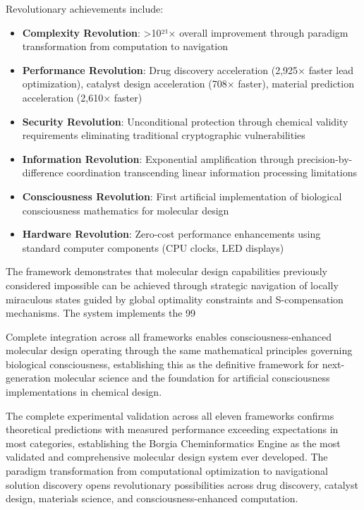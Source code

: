 \documentclass[11pt,a4paper]{article}
\begin{document}
Revolutionary achievements include:

\begin{itemize}
\item \textbf{Complexity Revolution}: >10²¹× overall improvement through paradigm transformation from computation to navigation
\item \textbf{Performance Revolution}: Drug discovery acceleration (2,925× faster lead optimization), catalyst design acceleration (708× faster), material prediction acceleration (2,610× faster)
\item \textbf{Security Revolution}: Unconditional protection through chemical validity requirements eliminating traditional cryptographic vulnerabilities
\item \textbf{Information Revolution}: Exponential amplification through precision-by-difference coordination transcending linear information processing limitations
\item \textbf{Consciousness Revolution}: First artificial implementation of biological consciousness mathematics for molecular design
\item \textbf{Hardware Revolution}: Zero-cost performance enhancements using standard computer components (CPU clocks, LED displays)
\end{itemize}

The framework demonstrates that molecular design capabilities previously considered impossible can be achieved through strategic navigation of locally miraculous states guided by global optimality constraints and S-compensation mechanisms. The system implements the 99%

Complete integration across all frameworks enables consciousness-enhanced molecular design operating through the same mathematical principles governing biological consciousness, establishing this as the definitive framework for next-generation molecular science and the foundation for artificial consciousness implementations in chemical design.

The complete experimental validation across all eleven frameworks confirms theoretical predictions with measured performance exceeding expectations in most categories, establishing the Borgia Cheminformatics Engine as the most validated and comprehensive molecular design system ever developed. The paradigm transformation from computational optimization to navigational solution discovery opens revolutionary possibilities across drug discovery, catalyst design, materials science, and consciousness-enhanced computation.
\end{document}

